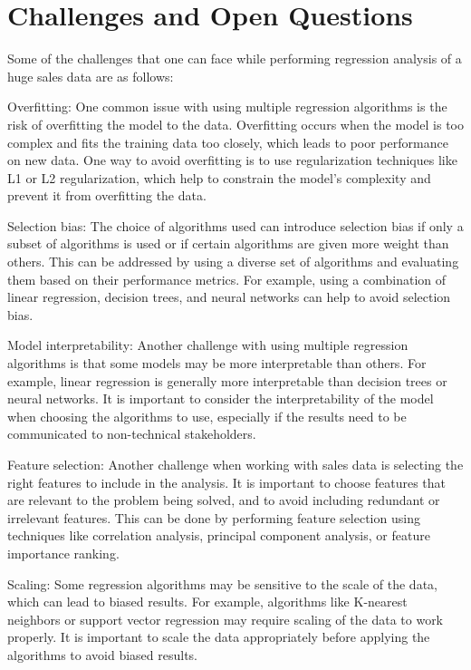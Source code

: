 %
%

\chapter{Challenges and Open Questions}

Some of the challenges that one can face while performing regression analysis of a huge sales data are as follows:

Overfitting: One common issue with using multiple regression algorithms is the risk of overfitting the model to the data. Overfitting occurs when the model is too complex and fits the training data too closely, which leads to poor performance on new data. One way to avoid overfitting is to use regularization techniques like L1 or L2 regularization, which help to constrain the model's complexity and prevent it from overfitting the data.

Selection bias: The choice of algorithms used can introduce selection bias if only a subset of algorithms is used or if certain algorithms are given more weight than others. This can be addressed by using a diverse set of algorithms and evaluating them based on their performance metrics. For example, using a combination of linear regression, decision trees, and neural networks can help to avoid selection bias. \cite{Jindong:2019}

Model interpretability: Another challenge with using multiple regression algorithms is that some models may be more interpretable than others. For example, linear regression is generally more interpretable than decision trees or neural networks. It is important to consider the interpretability of the model when choosing the algorithms to use, especially if the results need to be communicated to non-technical stakeholders.

Feature selection: Another challenge when working with sales data is selecting the right features to include in the analysis. It is important to choose features that are relevant to the problem being solved, and to avoid including redundant or irrelevant features. This can be done by performing feature selection using techniques like correlation analysis, principal component analysis, or feature importance ranking.

Scaling: Some regression algorithms may be sensitive to the scale of the data, which can lead to biased results. For example, algorithms like K-nearest neighbors or support vector regression may require scaling of the data to work properly. It is important to scale the data appropriately before applying the algorithms to avoid biased results.

